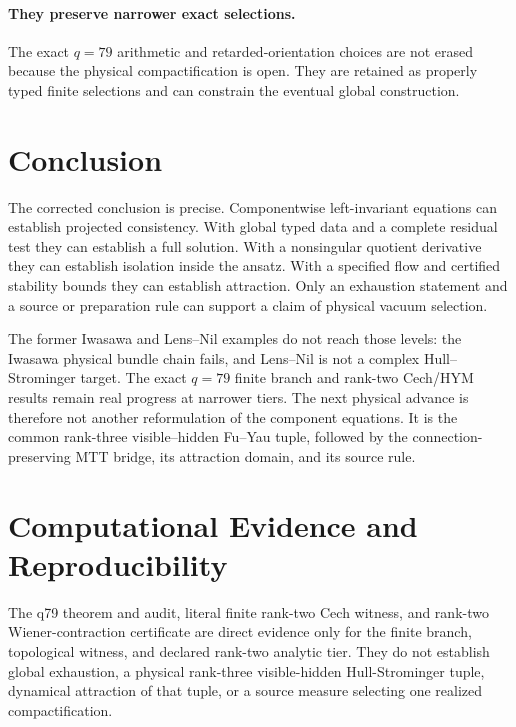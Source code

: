 \documentclass[11pt]{article}
\numberwithin{equation}{section}
\theoremstyle{definition}
\theoremstyle{plain}
\theoremstyle{remark}
\begin{document}
\paragraph{They preserve narrower exact selections.}
The exact \(q=79\) arithmetic and retarded-orientation choices are not erased
because the physical compactification is open.  They are retained as
properly typed finite selections and can constrain the eventual global
construction.

\section{Conclusion}

The corrected conclusion is precise.  Componentwise left-invariant equations
can establish projected consistency.  With global typed data and a complete
residual test they can establish a full solution.  With a nonsingular
quotient derivative they can establish isolation inside the ansatz.  With a
specified flow and certified stability bounds they can establish attraction.
Only an exhaustion statement and a source or preparation rule can support a
claim of physical vacuum selection.

The former Iwasawa and Lens--Nil examples do not reach those levels: the
Iwasawa physical bundle chain fails, and Lens--Nil is not a complex
Hull--Strominger target.  The exact \(q=79\) finite branch and rank-two
Cech/HYM results remain real progress at narrower tiers.  The next physical
advance is therefore not another reformulation of the component equations.
It is the common rank-three visible--hidden Fu--Yau tuple, followed by the
connection-preserving MTT bridge, its attraction domain, and its source rule.





\section*{Computational Evidence and Reproducibility}
The q79 theorem and audit, literal finite rank-two Cech witness, and rank-two Wiener-contraction certificate are direct evidence only for the finite branch, topological witness, and declared rank-two analytic tier. They do not establish global exhaustion, a physical rank-three visible-hidden Hull-Strominger tuple, dynamical attraction of that tuple, or a source measure selecting one realized compactification.
\end{document}

